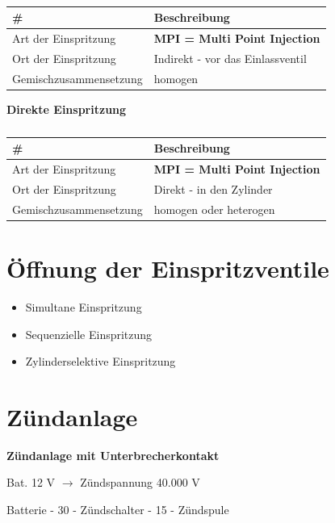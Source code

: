 \begin{table}[!ht]%
\centering 
	\caption{}%
\begin{tabular}{@{}ll@{}}
\hline
\textbf{\#} & \textbf{Beschreibung} \\
\hline
Art der Einspritzung & \textbf{MPI = Multi Point Injection} \\
Ort der Einspritzung & Indirekt - vor das Einlassventil \\
Gemischzusammensetzung & homogen \\
\hline
\end{tabular} 
\end{table}

\textbf{Direkte Einspritzung}

\begin{table}[!ht]%
\centering 
	\caption{}%
\begin{tabular}{@{}ll@{}}
\hline
\textbf{\#} & \textbf{Beschreibung} \\
\hline
Art der Einspritzung & \textbf{MPI = Multi Point Injection} \\
Ort der Einspritzung & Direkt - in den Zylinder \\
Gemischzusammensetzung & homogen oder heterogen \\
\hline
\end{tabular} 
\end{table}

\section{Öffnung der
Einspritzventile}\label{oeffnung-der-einspritzventile}

\begin{itemize}
\item
  Simultane Einspritzung
\item
  Sequenzielle Einspritzung
\item
  Zylinderselektive Einspritzung
\end{itemize}

\section{Zündanlage}\label{zuendanlage}

\textbf{Zündanlage mit Unterbrecherkontakt}

Bat. 12 V $\to$ Zündspannung 40.000 V

Batterie - 30 - Zündschalter - 15 - Zündspule

